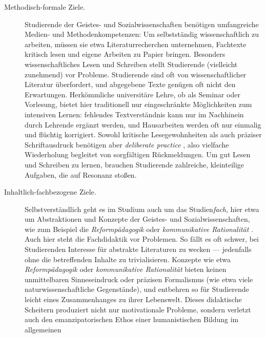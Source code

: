 \documentclass[11pt,a4paper,oneside]{article}
\begin{document}
\begin{description}
	\item[Methodisch-formale Ziele.]
		Studierende der Geistes- und Sozialwissenschaften benötigen umfangreiche Medien- und Methodenkompetenzen: Um selbstständig wissenschaftlich zu arbeiten, müssen sie etwa Literaturrecherchen unternehmen, Fachtexte kritisch lesen und eigene Arbeiten zu Papier bringen.
		Besonders wissenschaftliches Lesen und Schreiben stellt Studierende (vielleicht zunehmend) vor Probleme.
		Studierende sind oft von wissenschaftlicher Literatur überfordert, und abgegebene Texte genügen oft nicht den Erwartungen.
		Herkömmliche universitäre Lehre, ob als Seminar oder Vorlesung, bietet hier traditionell nur eingeschränkte Möglichkeiten zum intensiven Lernen: fehlendes Textverständnis kann nur im Nachhinein durch Lehrende ergänzt werden, und Hausarbeiten werden oft nur einmalig und flüchtig korrigiert.
		Sowohl kritische Lesegewohnheiten als auch präziser Schriftausdruck benötigen aber \emph{deliberate practice} \cite{Ericsson2007}, also vielfache Wiederholung begleitet von sorgfältigen Rückmeldungen.
		Um gut Lesen und Schreiben zu lernen, brauchen Studierende zahlreiche, kleinteilige Aufgaben, die auf Resonanz stoßen.
	\item[Inhaltlich-fachbezogene Ziele.]
		Selbstverständlich geht es im Studium auch um das Studien\emph{fach}, hier etwa um Abstraktionen und Konzepte der Geistes- und Sozialwissenschaften, wie zum Beispiel die \emph{Reformpädagogik} \cite{Freinet1979}
		oder \emph{kommunikative Rationalität} \cite{Habermas1988a}.
		Auch hier steht die Fachdidaktik vor Problemen.
		So fällt es oft schwer, bei Studierenden Interesse für abstrakte Literaturen zu wecken --- jedenfalls ohne die betreffenden Inhalte zu trivialisieren.
		Konzepte wie etwa \emph{Reformpädagogik} oder \emph{kommunikative Rationalität} bieten keinen unmittelbaren Sinneseindruck oder präzisen Formalismus (wie etwa viele naturwissenschaftliche Gegenstände), und entbehren so für Studierende leicht eines Zusammenhanges zu ihrer Lebenswelt.
		Dieses didaktische Scheitern produziert nicht nur motivationale Probleme, sondern verletzt auch den emanzipatorischen Ethos einer humanistischen Bildung im allgemeinen %

\end{description}
\end{document}
